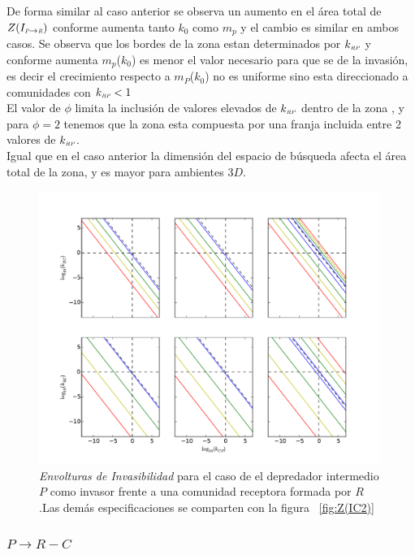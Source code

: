 De forma similar al caso anterior se observa un aumento en el \'area total de $Z(I_{\textit{\tiny P} \to \textit{\tiny R}})$ conforme aumenta tanto $k_0$ como $m_p$ y el cambio es similar en ambos casos. Se observa que los bordes de la zona estan determinados por $k_{\textit{\tiny RP}}$ y conforme aumenta $m_p$($k_0$) es menor el valor necesario para que se de la invasi\'on, es decir el crecimiento respecto a $m_P$($k_0$) no es uniforme sino esta direccionado a comunidades con $k_{\textit{\tiny RP}} < 1 $ \\
El valor de $\phi$ limita la inclusi\'on de valores elevados de $k_{\textit{\tiny RP}}$ dentro de la zona , y para $\phi = 2$ tenemos que la zona esta compuesta por una franja incluida entre 2 valores de $k_{\textit{\tiny RP}}$.\\
Igual que en el caso anterior la dimensi\'on del espacio de b\'usqueda afecta el \'area total de la zona, y es mayor para ambientes $3D$.

\begin{figure}
  \centering
  \includegraphics[width = 0.99\textwidth]{./Plots/Z(IC3)AcGrGr.pdf}
  \caption[Env $Z(IC2)$]{\emph{Envolturas de Invasibilidad} para el caso de el depredador intermedio $P$ como invasor frente a una comunidad receptora formada por $R$.Las dem\'as especificaciones se comparten con la figura ~\ref{fig:Z(IC2)}}
  \label{fig:Z(IC3)}
\end{figure}


\subsubsection{$ P \to R-C$}

